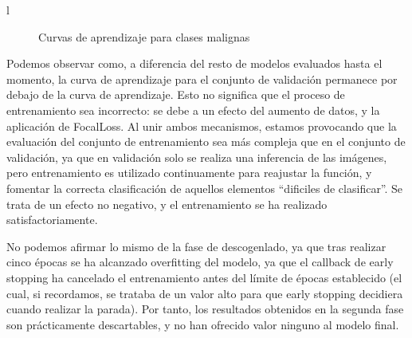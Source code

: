 l\begin{figure}[H]
	\centering
	\caption{Curvas de aprendizaje para clases malignas}
	\label{fig:curvasmalign}
\end{figure}

Podemos observar como, a diferencia del resto de modelos evaluados hasta el momento, la curva de aprendizaje para el conjunto de validación permanece por debajo de la curva de aprendizaje. Esto no significa que el proceso de entrenamiento sea incorrecto: se debe a un efecto del aumento de datos, y la aplicación de FocalLoss. Al unir ambos mecanismos, estamos provocando que la evaluación del conjunto de entrenamiento sea más compleja que en el conjunto de validación, ya que en validación solo se realiza una inferencia de las imágenes, pero entrenamiento es utilizado continuamente para reajustar la función, y fomentar la correcta clasificación de aquellos elementos ``dificiles de clasificar''. Se trata de un efecto no negativo, y el entrenamiento se ha realizado satisfactoriamente.

No podemos afirmar lo mismo de la fase de descogenlado, ya que tras realizar cinco épocas se ha alcanzado overfitting del modelo, ya que el callback de early stopping ha cancelado el entrenamiento antes del límite de épocas establecido (el cual, si recordamos, se trataba de un valor alto para que early stopping decidiera cuando realizar la parada). Por tanto, los resultados obtenidos en la segunda fase son prácticamente descartables, y no han ofrecido valor ninguno al modelo final.

